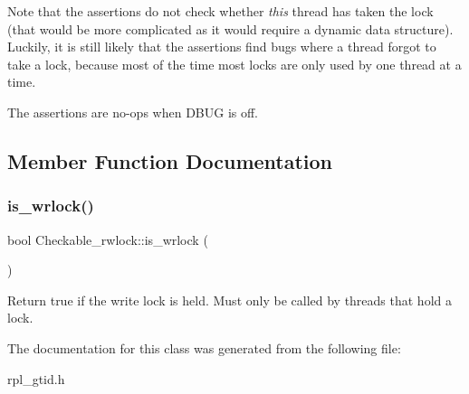 Note that the assertions do not check whether {\itshape this} thread has taken the lock (that would be more complicated as it would require a dynamic data structure). Luckily, it is still likely that the assertions find bugs where a thread forgot to take a lock, because most of the time most locks are only used by one thread at a time.

The assertions are no-\/ops when D\+B\+UG is off. 

\subsection{Member Function Documentation}
\mbox{\label{classCheckable__rwlock_ae0c50e01a86f053d4bc6f6a3d12fa8d6}} 
\subsubsection{\texorpdfstring{is\+\_\+wrlock()}{is\_wrlock()}}
{\footnotesize\ttfamily bool Checkable\+\_\+rwlock\+::is\+\_\+wrlock (\begin{DoxyParamCaption}{ }\end{DoxyParamCaption})\hspace{0.3cm}{\ttfamily [inline]}}

Return true if the write lock is held. Must only be called by threads that hold a lock. 

The documentation for this class was generated from the following file\+:\begin{DoxyCompactItemize}
\item 
rpl\+\_\+gtid.\+h\end{DoxyCompactItemize}
